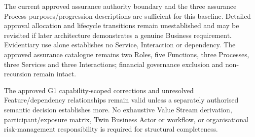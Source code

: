 \label{rad:metamodel:457}

The current approved assurance authority boundary and the three assurance Process purposes/\allowbreak{}progression descriptions are sufficient for this baseline. Detailed approval allocation and lifecycle transitions remain unestablished and may be revisited if later architecture demonstrates a genuine Business requirement. Evidentiary use alone establishes no Service, Interaction or dependency. The approved assurance catalogue remains two Roles, five Functions, three Processes, three Services and three Interactions; financial governance exclusion and non-recursion remain intact.

\label{rad:metamodel:459}

The approved G1 capability-scoped corrections and unresolved Feature/\allowbreak{}dependency relationships remain valid unless a separately authorised semantic decision establishes more. No exhaustive Value Stream derivation, participant/\allowbreak{}exposure matrix, Twin Business Actor or workflow, or organisational risk-management responsibility is required for structural completeness.

